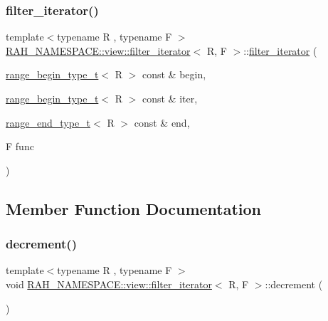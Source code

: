 \subsubsection{\texorpdfstring{filter\_iterator()}{filter\_iterator()}}
{\footnotesize\ttfamily template$<$typename R , typename F $>$ \\
\mbox{\hyperlink{struct_r_a_h___n_a_m_e_s_p_a_c_e_1_1view_1_1filter__iterator}{R\+A\+H\+\_\+\+N\+A\+M\+E\+S\+P\+A\+C\+E\+::view\+::filter\+\_\+iterator}}$<$ R, F $>$\+::\mbox{\hyperlink{struct_r_a_h___n_a_m_e_s_p_a_c_e_1_1view_1_1filter__iterator}{filter\+\_\+iterator}} (\begin{DoxyParamCaption}\item[{\mbox{\hyperlink{namespace_r_a_h___n_a_m_e_s_p_a_c_e_a46705781d6869d5151141f871ced1e9c}{range\+\_\+begin\+\_\+type\+\_\+t}}$<$ R $>$ const \&}]{begin,  }\item[{\mbox{\hyperlink{namespace_r_a_h___n_a_m_e_s_p_a_c_e_a46705781d6869d5151141f871ced1e9c}{range\+\_\+begin\+\_\+type\+\_\+t}}$<$ R $>$ const \&}]{iter,  }\item[{\mbox{\hyperlink{namespace_r_a_h___n_a_m_e_s_p_a_c_e_aadeb8c12d454f4cc70bf80766871d3b2}{range\+\_\+end\+\_\+type\+\_\+t}}$<$ R $>$ const \&}]{end,  }\item[{F}]{func }\end{DoxyParamCaption})\hspace{0.3cm}{\ttfamily [inline]}}



\subsection{Member Function Documentation}
\mbox{\label{struct_r_a_h___n_a_m_e_s_p_a_c_e_1_1view_1_1filter__iterator_aeff224e6abd4739e22439570377ebb33}} 
\subsubsection{\texorpdfstring{decrement()}{decrement()}}
{\footnotesize\ttfamily template$<$typename R , typename F $>$ \\
void \mbox{\hyperlink{struct_r_a_h___n_a_m_e_s_p_a_c_e_1_1view_1_1filter__iterator}{R\+A\+H\+\_\+\+N\+A\+M\+E\+S\+P\+A\+C\+E\+::view\+::filter\+\_\+iterator}}$<$ R, F $>$\+::decrement (\begin{DoxyParamCaption}{ }\end{DoxyParamCaption})\hspace{0.3cm}{\ttfamily [inline]}}

